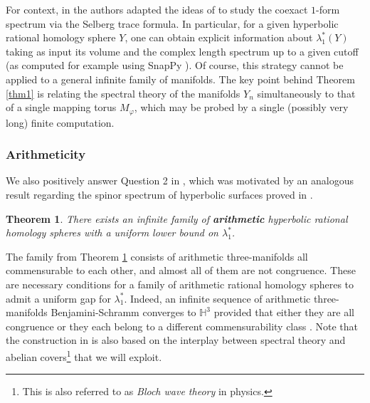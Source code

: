 \documentclass[11pt]{amsart}
\newtheorem{thm}{Theorem}
\theoremstyle{definition}
\theoremstyle{remark}
\begin{document}
\par
For context, in \cite{LL1} the authors adapted the ideas of \cite{BS} to study the coexact $1$-form spectrum via the Selberg trace formula. In particular, for a given hyperbolic rational homology sphere $Y$, one can obtain explicit information about $\lambda_1^*(Y)$ taking as input its volume and the complex length spectrum up to a given cutoff (as computed for example using SnapPy \cite{SnapPy}). Of course, this strategy cannot be applied to a general infinite family of manifolds. The key point behind Theorem \ref{thm1} is relating the spectral theory of the manifolds $Y_n$ simultaneously to that of a single mapping torus $M_\varphi$, which may be probed by a single (possibly very long) finite computation.

\subsubsection*{Arithmeticity} We also positively answer Question 2 in \cite{AAGLZ}, which was motivated by an analogous result regarding the spinor spectrum of hyperbolic surfaces proved in \cite{AG}.
\begin{thm}\label{thm2}
There exists an infinite family of \textbf{arithmetic} hyperbolic rational homology spheres with a uniform lower bound on $\lambda_1^*$.
\end{thm}
The family from Theorem \ref{thm2} consists of arithmetic three-manifolds all commensurable to each other, and almost all of them are not congruence. These are necessary conditions for a family of arithmetic rational homology spheres to admit a uniform gap for $\lambda_1^*.$  Indeed, an infinite sequence of arithmetic three-manifolds Benjamini-Schramm converges to $\mathbb{H}^3$ provided that either they are all congruence or they each belong to a different commensurability class \cite{FS}. Note that the construction in \cite{AG} is also based on the interplay between spectral theory and abelian covers\footnote{This is also referred to as \textit{Bloch wave theory} \cite{DDJ} in physics.} that we will exploit.
\end{document}
